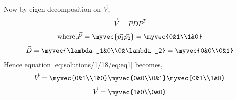		Now by eigen decomposition on $\vec{V}$,
		\begin{align}
			\vec{V} = \vec{PDP^T}
			\label{eq:solutions/1/18/eq:eq2}
		\end{align}
		\begin{align}
			\mbox{where,} \vec{P} = \myvec{\vec{p_1} \vec{p_2}} = \myvec{0&1\\1&0}
		\end{align}
		\begin{align}
			\vec{D} = \myvec{\lambda_1&0\\0&\lambda_2} = \myvec{0&0\\0&1}
		\end{align}
		Hence equation \eqref{eq:solutions/1/18/eq:eq1} becomes,
		\begin{align}
			\vec{V} = \myvec{0&1\\1&0}\myvec{0&0\\0&1}\myvec{0&1\\1&0}
		\end{align}
		\begin{align}
			\vec{V} = \myvec{1&0\\0&0}
		\end{align}
	
